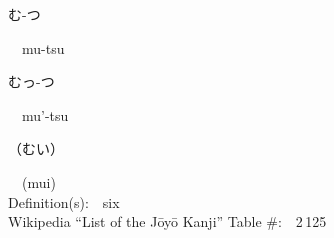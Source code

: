 \begin{multicols}{2}
{\hspace*{2em}}{\begin{CJK}{UTF8}{min} む-つ \end{CJK}}\ \ mu-tsu\ \ \\
{\hspace*{2em}}{\begin{CJK}{UTF8}{min} むっ-つ \end{CJK}}\ \ mu'-tsu\ \ \\
{\hspace*{2em}}{\begin{CJK}{UTF8}{min} （むい） \end{CJK}}\ \ (mui)\ \ \\
Definition(s):\ \ six \\
Wikipedia ``List of the J\=oy\=o Kanji'' Table \#:\ \ 2\,125 \\
\ \ \\
\end{multicols}




